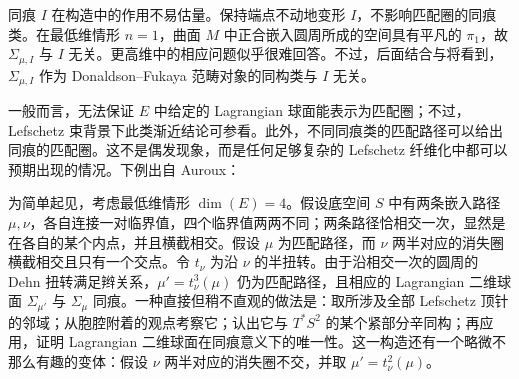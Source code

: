\begin{note}\label{st:16.11}
同痕 $I$ 在构造中的作用不易估量。保持端点不动地变形 $I$，不影响匹配圈的同痕类。在最低维情形 $n=1$，曲面 $M$ 中正合嵌入圆周所成的空间具有平凡的 $\pi_1$，故 $\Sigma_{\mu,I}$ 与 $I$ 无关。更高维中的相应问题似乎很难回答。不过，后面结合与将看到，$\Sigma_{\mu,I}$ 作为 Donaldson–Fukaya 范畴对象的同构类与 $I$ 无关。
\end{note}

一般而言，无法保证 $E$ 中给定的 Lagrangian 球面能表示为匹配圈；不过，Lefschetz 束背景下此类渐近结论可参看。此外，不同同痕类的匹配路径可以给出同痕的匹配圈。这不是偶发现象，而是任何足够复杂的 Lefschetz 纤维化中都可以预期出现的情况。下例出自 Auroux：

\begin{example}\label{st:16.12}
为简单起见，考虑最低维情形 $\dim(E)=4$。假设底空间 $S$ 中有两条嵌入路径 $\mu,\nu$，各自连接一对临界值，四个临界值两两不同；两条路径恰相交一次，显然是在各自的某个内点，并且横截相交。假设 $\mu$ 为匹配路径，而 $\nu$ 两半对应的消失圈横截相交且只有一个交点。令 $t_\nu$ 为沿 $\nu$ 的半扭转。由于沿相交一次的圆周的 Dehn 扭转满足辫关系，$\mu'=t_\nu^3(\mu)$ 仍为匹配路径，且相应的 Lagrangian 二维球面 $\Sigma_{\mu'}$ 与 $\Sigma_\mu$ 同痕。一种直接但稍不直观的做法是：取所涉及全部 Lefschetz 顶针的邻域；从胞腔附着的观点考察它；认出它与 $T^*S^2$ 的某个紧部分辛同构；再应用，证明 Lagrangian 二维球面在同痕意义下的唯一性。这一构造还有一个略微不那么有趣的变体：假设 $\nu$ 两半对应的消失圈不交，并取 $\mu'=t_\nu^2(\mu)$。
\end{example}
